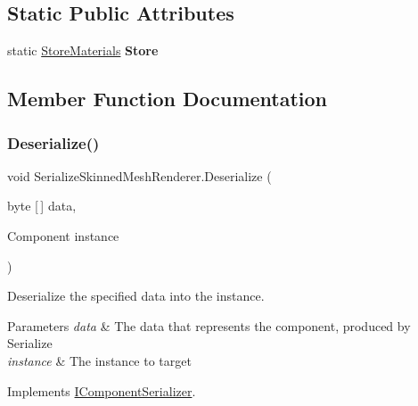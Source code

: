 \subsection*{Static Public Attributes}
\begin{DoxyCompactItemize}
\item 
\mbox{\label{class_serialize_skinned_mesh_renderer_aea00be7a265b75c63258cfbf9b0b3b79}} 
static \hyperlink{class_store_materials}{Store\+Materials} {\bfseries Store}
\end{DoxyCompactItemize}


\subsection{Member Function Documentation}
\mbox{\label{class_serialize_skinned_mesh_renderer_ae689a9e0a41aa23ec86f46bffa56b7b5}} 
\subsubsection{\texorpdfstring{Deserialize()}{Deserialize()}}
{\footnotesize\ttfamily void Serialize\+Skinned\+Mesh\+Renderer.\+Deserialize (\begin{DoxyParamCaption}\item[{byte \mbox{[}$\,$\mbox{]}}]{data,  }\item[{Component}]{instance }\end{DoxyParamCaption})\hspace{0.3cm}{\ttfamily [inline]}}



Deserialize the specified data into the instance. 


\begin{DoxyParams}{Parameters}
{\em data} & The data that represents the component, produced by Serialize \\
\hline
{\em instance} & The instance to target \\
\hline
\end{DoxyParams}


Implements \hyperlink{interface_i_component_serializer_a4cc366a5c78b33d47a90c209d8fed883}{I\+Component\+Serializer}.

